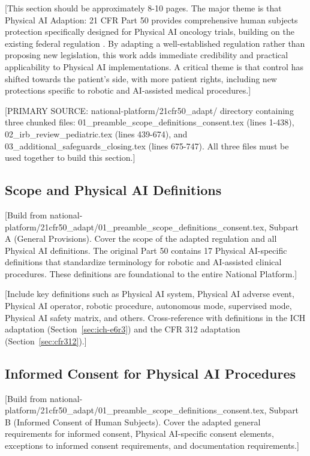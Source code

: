 
[This section should be approximately 8-10 pages. The major theme is that
Physical AI Adaption: 21 CFR Part 50 \cite{cfr50-adapt} provides comprehensive
human subjects protection specifically designed for Physical AI oncology trials,
building on the existing federal regulation \cite{cfr-part-50}. By adapting
a well-established regulation rather than proposing new legislation, this work
adds immediate credibility and practical applicability to Physical AI
implementations. A critical theme is that control has shifted towards the
patient's side, with more patient rights, including new protections specific
to robotic and AI-assisted medical procedures.]

[PRIMARY SOURCE: national-platform/21cfr50\_adapt/ directory containing three
chunked files: 01\_preamble\_scope\_definitions\_consent.tex (lines 1-438),
02\_irb\_review\_pediatric.tex (lines 439-674), and
03\_additional\_safeguards\_closing.tex (lines 675-747). All three files must
be used together to build this section.]

\subsection{Scope and Physical AI Definitions}
\label{subsec:cfr50-scope}

[Build from national-platform/21cfr50\_adapt/01\_preamble\_scope\_definitions\_consent.tex,
Subpart A (General Provisions). Cover the scope of the adapted regulation and
all Physical AI definitions. The original Part 50 contains 17 Physical AI-specific
definitions that standardize terminology for robotic and AI-assisted clinical
procedures. These definitions are foundational to the entire National Platform.]

[Include key definitions such as Physical AI system, Physical AI adverse event,
Physical AI operator, robotic procedure, autonomous mode, supervised mode,
Physical AI safety matrix, and others. Cross-reference with definitions in the
ICH adaptation (Section~\ref{sec:ich-e6r3}) and the CFR 312 adaptation
(Section~\ref{sec:cfr312}).]

\subsection{Informed Consent for Physical AI Procedures}
\label{subsec:cfr50-consent}

[Build from national-platform/21cfr50\_adapt/01\_preamble\_scope\_definitions\_consent.tex,
Subpart B (Informed Consent of Human Subjects). Cover the adapted general
requirements for informed consent, Physical AI-specific consent elements,
exceptions to informed consent requirements, and documentation requirements.]

